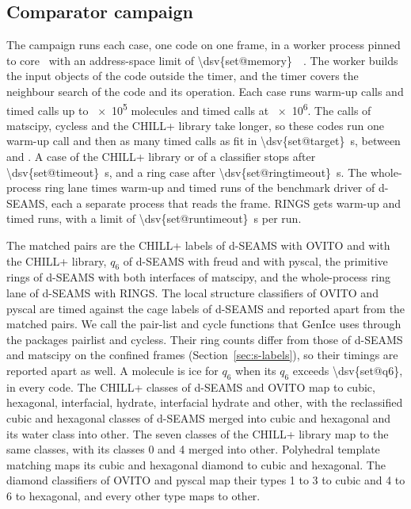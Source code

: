 \documentclass[preprint,12pt]{elsarticle}
\begin{document}
\subsection{Comparator campaign}
\label{sec:s-campaign}

The campaign runs each case, one code on one frame, in a worker process
pinned to core~ with an address-space limit of
\qty{\dsv{set@memory}}{\gibi\byte}.
The worker builds the input objects of the code outside the timer, and
the timer covers the neighbour search of the code and its operation.
Each case runs  warm-up calls and 
timed calls up to \num{e5} molecules and  timed
calls at \num{e6}.
The calls of matscipy, cycless and the CHILL+ library take longer, so
these codes run one warm-up call and then as many timed calls as fit in
\qty{\dsv{set@target}}{\second}, between  and
.
A case of the CHILL+ library or of a classifier stops after
\qty{\dsv{set@timeout}}{\second}, and a ring case after
\qty{\dsv{set@ringtimeout}}{\second}.
The whole-process ring lane times  warm-up and
 timed runs of the benchmark driver of d-SEAMS, each a
separate process that reads the frame.
RINGS gets  warm-up and 
timed runs, with a limit of \qty{\dsv{set@runtimeout}}{\second} per run.

The matched pairs are the CHILL+ labels of d-SEAMS with OVITO and with
the CHILL+ library, $q_6$ of d-SEAMS with freud and with pyscal, the
primitive rings of d-SEAMS with both interfaces of matscipy, and the
whole-process ring lane of d-SEAMS with RINGS.
The local structure classifiers of OVITO and pyscal are timed against
the cage labels of d-SEAMS and reported apart from the matched pairs.
We call the pair-list and cycle functions that GenIce uses through the
packages pairlist and cycless.
Their ring counts differ from those of d-SEAMS and matscipy on the
confined frames (Section~\ref{sec:s-labels}), so their timings are
reported apart as well.
A molecule is ice for $q_6$ when its $q_6$ exceeds \num{\dsv{set@q6}},
in every code.
The CHILL+ classes of d-SEAMS and OVITO map to cubic, hexagonal,
interfacial, hydrate, interfacial hydrate and other, with the
reclassified cubic and hexagonal classes of d-SEAMS merged into cubic
and hexagonal and its water class into other.
The seven classes of the CHILL+ library map to the same classes, with
its classes 0 and 4 merged into other.
Polyhedral template matching maps its cubic and hexagonal diamond to
cubic and hexagonal.
The diamond classifiers of OVITO and pyscal map their types 1 to 3 to
cubic and 4 to 6 to hexagonal, and every other type maps to other.
\end{document}
